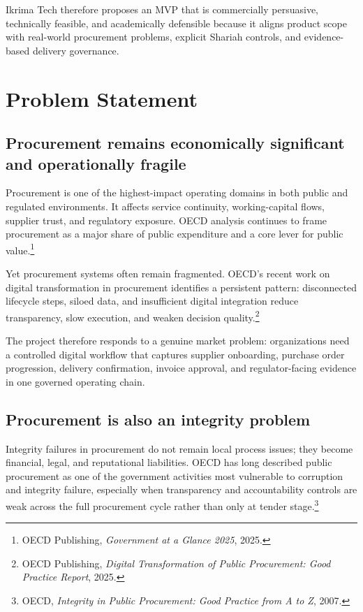 \documentclass[11pt,a4paper]{article}
\begin{document}
Ikrima Tech therefore proposes an MVP that is commercially persuasive, technically feasible, and academically defensible because it aligns product scope with real-world procurement problems, explicit Shariah controls, and evidence-based delivery governance.

\section{Problem Statement}

\subsection{Procurement remains economically significant and operationally fragile}

Procurement is one of the highest-impact operating domains in both public and regulated environments. It affects service continuity, working-capital flows, supplier trust, and regulatory exposure. OECD analysis continues to frame procurement as a major share of public expenditure and a core lever for public value.\footnote{OECD Publishing, \emph{Government at a Glance 2025}, 2025.}

Yet procurement systems often remain fragmented. OECD's recent work on digital transformation in procurement identifies a persistent pattern: disconnected lifecycle steps, siloed data, and insufficient digital integration reduce transparency, slow execution, and weaken decision quality.\footnote{OECD Publishing, \emph{Digital Transformation of Public Procurement: Good Practice Report}, 2025.}

The project therefore responds to a genuine market problem: organizations need a controlled digital workflow that captures supplier onboarding, purchase order progression, delivery confirmation, invoice approval, and regulator-facing evidence in one governed operating chain.

\subsection{Procurement is also an integrity problem}

Integrity failures in procurement do not remain local process issues; they become financial, legal, and reputational liabilities. OECD has long described public procurement as one of the government activities most vulnerable to corruption and integrity failure, especially when transparency and accountability controls are weak across the full procurement cycle rather than only at tender stage.\footnote{OECD, \emph{Integrity in Public Procurement: Good Practice from A to Z}, 2007.}
\end{document}
